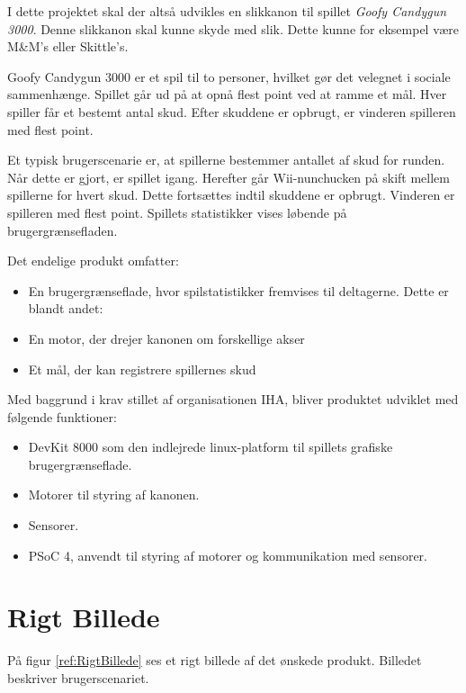 I dette projektet skal der altså udvikles en slikkanon til spillet \textit{Goofy Candygun 3000}. Denne slikkanon skal kunne skyde med slik. Dette kunne for eksempel være M\&M’s eller Skittle’s.

Goofy Candygun 3000 er et spil til to personer, hvilket gør det velegnet i sociale sammenhænge. Spillet går ud på at opnå flest point ved at ramme et mål. Hver spiller får et bestemt antal skud. Efter skuddene er opbrugt, er vinderen spilleren med flest point.

Et typisk brugerscenarie er, at spillerne bestemmer antallet af skud for runden. Når dette er gjort, er spillet igang. Herefter går Wii-nunchucken på skift mellem spillerne for hvert skud. Dette fortsættes indtil skuddene er opbrugt. Vinderen er spilleren med flest point. Spillets statistikker vises løbende på brugergrænsefladen. 

Det endelige produkt omfatter:
\begin{itemize}
	\item{En brugergrænseflade, hvor spilstatistikker fremvises til deltagerne. Dette er blandt andet:}
	\item{En motor, der drejer kanonen om forskellige akser}
	\item{Et mål, der kan registrere spillernes skud}
\end{itemize}

Med baggrund i krav stillet af organisationen IHA, bliver produktet udviklet med følgende funktioner:

\begin{itemize}
	\item DevKit 8000 som den indlejrede linux-platform til spillets grafiske brugergrænseflade.
	\item Motorer til styring af kanonen.
	\item Sensorer.
	\item PSoC 4, anvendt til styring af motorer og kommunikation med sensorer.
\end{itemize}

\newpage
\section{Rigt Billede}

På figur \ref{ref:RigtBillede} ses et rigt billede af det ønskede produkt. Billedet beskriver brugerscenariet.

